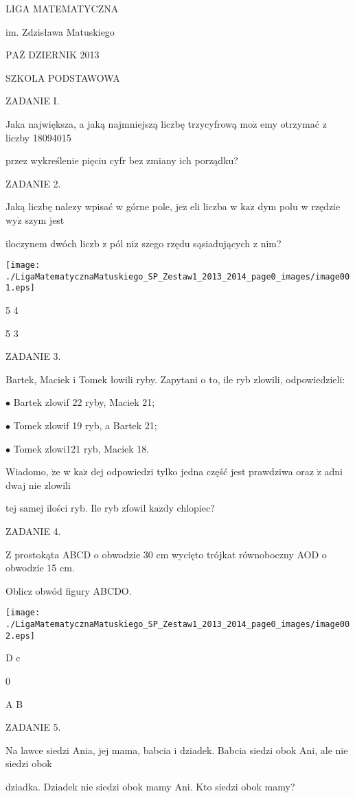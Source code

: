 \documentclass[a4paper,12pt]{article}
\begin{document}
LIGA MATEMATYCZNA

im. Zdzisława Matuskiego

$\mathrm{P}\mathrm{A}\overline{\mathrm{Z}}$ DZIERNIK 2013

SZKOLA PODSTAWOWA

ZADANIE I.

Jaka największa, a jaką najmniejszą liczbę trzycyfrową $\mathrm{m}\mathrm{o}\dot{\mathrm{z}}$ emy otrzymać z liczby 18094015

przez wykreślenie pięciu cyfr bez zmiany ich porządku?

ZADANIE 2.

Jaką liczbę nalezy wpisać w górne pole, $\mathrm{j}\mathrm{e}\dot{\mathrm{z}}$ eli liczba w $\mathrm{k}\mathrm{a}\dot{\mathrm{z}}$ dym polu w rzędzie $\mathrm{w}\mathrm{y}\dot{\mathrm{z}}$ szym jest

iloczynem dwóch liczb z pól $\mathrm{n}\mathrm{i}\dot{\mathrm{z}}$ szego rzędu sąsiadujących z nim?
\begin{center}
\texttt{[image: ./LigaMatematycznaMatuskiego\_SP\_Zestaw1\_2013\_2014\_page0\_images/image001.eps]}
\end{center}
5 4

5 3

ZADANIE 3.

Bartek, Maciek i Tomek łowili ryby. Zapytani o to, ile ryb zlowili, odpowiedzieli:

$\bullet$ Bartek zlowif 22 ryby, Maciek 21;

$\bullet$ Tomek zlowif 19 ryb, a Bartek 21;

$\bullet$ Tomek zlowi121 ryb, Maciek 18.

Wiadomo, $\dot{\mathrm{z}}\mathrm{e}$ w $\mathrm{k}\mathrm{a}\dot{\mathrm{z}}$ dej odpowiedzi tylko jedna część jest prawdziwa oraz $\dot{\mathrm{z}}$ adni dwaj nie zlowili

tej samej ilości ryb. Ile ryb zfowil $\mathrm{k}\mathrm{a}\dot{\mathrm{z}}\mathrm{d}\mathrm{y}$ chlopiec?

ZADANIE 4.

Z prostokąta ABCD o obwodzie 30 cm wycięto trójkat równoboczny AOD o obwodzie 15 cm.

Oblicz obwód figury ABCDO.
\begin{center}
\texttt{[image: ./LigaMatematycznaMatuskiego\_SP\_Zestaw1\_2013\_2014\_page0\_images/image002.eps]}
\end{center}
D  c

0

A  B

ZADANIE 5.

Na lawce siedzi Ania, jej mama, babcia i dziadek. Babcia siedzi obok Ani, ale nie siedzi obok

dziadka. Dziadek nie siedzi obok mamy Ani. Kto siedzi obok mamy?
\end{document}
